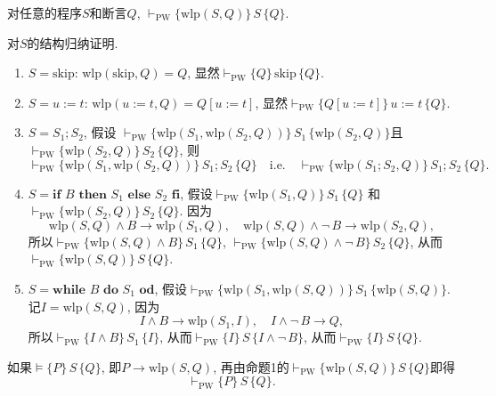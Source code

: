 \documentclass[UTF8]{ctexart}
\begin{document}
\vspace{1pt}\hspace{-1em}
对任意的程序$S$和断言$Q$,
$\vdash_{\mathrm{PW}}\{\mathrm{wlp}(S,Q)\}\,S\,\{Q\}$.

\vspace{3pt}
对$S$的结构归纳证明.

\begin{enumerate}
    \item $S=\mathrm{skip}$: $\mathrm{wlp}(\mathrm{skip},Q)=Q$,
    显然$\vdash_{\mathrm{PW}}\{Q\}\,\mathrm{skip}\,\{Q\}$.
    \item $S=u:=t$: $\mathrm{wlp}(u:=t,Q)=Q[u:=t]$,
    显然$\vdash_{\mathrm{PW}}\{Q[u:=t]\}\,u:=t\,\{Q\}$.
    \item $S=S_1;S_2$, 假设
    $\vdash_{\mathrm{PW}}\{\mathrm{wlp}(S_1,\mathrm{wlp}(S_2,Q))\}\,S_1\,
    \{\mathrm{wlp}(S_2,Q)\}$且
    $\vdash_{\mathrm{PW}}\{\mathrm{wlp}(S_2,Q)\}\,S_2\,\{Q\}$, 则
    \[
        \vdash_{\mathrm{PW}}\{\mathrm{wlp}(S_1,\mathrm{wlp}(S_2,Q))\}
        \,S_1;S_2\,\{Q\}\quad\text{i.e.}\quad
        \vdash_{\mathrm{PW}}\{\mathrm{wlp}(S_1;S_2,Q)\}\,S_1;S_2\,\{Q\}.
    \]
    \item $S=\mathbf{if}\,\,B\,\,\mathbf{then}\,\,S_1\,\,\mathbf{else}\,\,S_2\,\,
    \mathbf{fi}$, 假设$\vdash_{\mathrm{PW}}\{\mathrm{wlp}(S_1,Q)\}\,S_1\,\{Q\}$
    和$\vdash_{\mathrm{PW}}\{\mathrm{wlp}(S_2,Q)\}\,S_2\,\{Q\}$. 因为
    \[
        \mathrm{wlp}(S,Q)\land B\to\mathrm{wlp}(S_1,Q),\quad
        \mathrm{wlp}(S,Q)\land\neg\,B\to\mathrm{wlp}(S_2,Q),
    \]
    所以$\vdash_{\mathrm{PW}}\{\mathrm{wlp}(S,Q)\land B\}\,S_1\,\{Q\}$,
    $\vdash_{\mathrm{PW}}\{\mathrm{wlp}(S,Q)\land\neg\,B\}\,S_2\,\{Q\}$,
    从而$\vdash_{\mathrm{PW}}\{\mathrm{wlp}(S,Q)\}\,S\,\{Q\}$.
    \item $S=\mathbf{while}\,\,B\,\,\mathbf{do}\,\,S_1\,\,\mathbf{od}$,
    假设$\vdash_{\mathrm{PW}}\{\mathrm{wlp}(S_1,\mathrm{wlp}(S,Q))\}\,
    S_1\,\{\mathrm{wlp}(S,Q)\}$. 记$I=\mathrm{wlp}(S,Q)$, 因为
    \[
        I\land B\to\mathrm{wlp}(S_1,I),\quad I\land\neg\,B\to Q,
    \]
    所以$\vdash_{\mathrm{PW}}\{I\land B\}\,S_1\,\{I\}$,
    从而$\vdash_{\mathrm{PW}}\{I\}\,S\,\{I\land\neg\,B\}$,
    从而$\vdash_{\mathrm{PW}}\{I\}\,S\,\{Q\}$.
\end{enumerate}

\vspace{5pt}

如果$\models\{P\}\,S\,\{Q\}$, 即$P\to\mathrm{wlp}(S,Q)$,
再由命题1的$\vdash_{\mathrm{PW}}\{\mathrm{wlp}(S,Q)\}\,S\,\{Q\}$即得
\begin{equation*}
    \vdash_{\mathrm{PW}}\{P\}\,S\,\{Q\}.
\tag*{\qedsymbol}\end{equation*}
\end{document}
